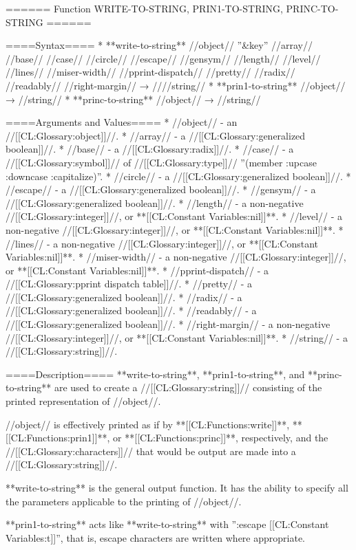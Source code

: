 ====== Function WRITE-TO-STRING, PRIN1-TO-STRING, PRINC-TO-STRING ======

====Syntax====
  * **write-to-string** //object// ''&key'' //array// //base// //case// //circle// //escape// //gensym// //length// //level// //lines// //miser-width// //pprint-dispatch// //pretty// //radix// //readably// //right-margin// → ////string//
  * **prin1-to-string** //object// → //string//
  * **princ-to-string** //object// → //string//

====Arguments and Values====
  * //object// - an //[[CL:Glossary:object]]//.
  * //array// - a //[[CL:Glossary:generalized boolean]]//.
  * //base// - a //[[CL:Glossary:radix]]//.
  * //case// - a //[[CL:Glossary:symbol]]// of //[[CL:Glossary:type]]// ''(member :upcase :downcase :capitalize)''.
  * //circle// - a //[[CL:Glossary:generalized boolean]]//.
  * //escape// - a //[[CL:Glossary:generalized boolean]]//.
  * //gensym// - a //[[CL:Glossary:generalized boolean]]//.
  * //length// - a non-negative //[[CL:Glossary:integer]]//, or **[[CL:Constant Variables:nil]]**.
  * //level// - a non-negative //[[CL:Glossary:integer]]//, or **[[CL:Constant Variables:nil]]**.
  * //lines// - a non-negative //[[CL:Glossary:integer]]//, or **[[CL:Constant Variables:nil]]**.
  * //miser-width// - a non-negative //[[CL:Glossary:integer]]//, or **[[CL:Constant Variables:nil]]**.
  * //pprint-dispatch// - a //[[CL:Glossary:pprint dispatch table]]//.
  * //pretty// - a //[[CL:Glossary:generalized boolean]]//.
  * //radix// - a //[[CL:Glossary:generalized boolean]]//.
  * //readably// - a //[[CL:Glossary:generalized boolean]]//.
  * //right-margin// - a non-negative //[[CL:Glossary:integer]]//, or **[[CL:Constant Variables:nil]]**.
  * //string// - a //[[CL:Glossary:string]]//.

====Description====
**write-to-string**, **prin1-to-string**, and **princ-to-string** are used to create a //[[CL:Glossary:string]]// consisting of the printed representation of //object//.

//object// is effectively printed as if by **[[CL:Functions:write]]**, **[[CL:Functions:prin1]]**, or **[[CL:Functions:princ]]**, respectively, and the //[[CL:Glossary:characters]]// that would be output are made into a //[[CL:Glossary:string]]//.

**write-to-string** is the general output function. It has the ability to specify all the parameters applicable to the printing of //object//.

**prin1-to-string** acts like **write-to-string** with '':escape [[CL:Constant Variables:t]]'', that is, escape characters are written where appropriate.

